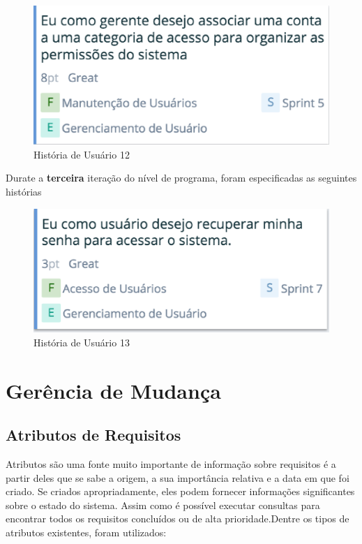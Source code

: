 \begin{figure}[H]
    \centering
	\includegraphics[keepaspectratio=true,scale=0.5]{figuras/time12.eps}
    \caption{História de Usuário 12}
    \label{fig:roadmap}
\end{figure}

Durate a \textbf{terceira} iteração do nível de programa, foram especificadas as seguintes histórias

\begin{figure}[H]
    \centering
	\includegraphics[keepaspectratio=true,scale=0.5]{figuras/time13.eps}
    \caption{História de Usuário 13}
    \label{fig:roadmap}
\end{figure}

\section{Gerência de Mudança}

\subsection{Atributos de Requisitos}

Atributos são uma fonte muito importante de informação sobre requisitos é a partir deles
que se sabe a origem, a sua importância relativa e a data em que foi criado.
Se criados apropriadamente, eles podem fornecer informações significantes sobre
o estado do sistema. Assim como é possível executar consultas para encontrar todos
os requisitos concluídos ou de alta prioridade.Dentre os tipos de atributos existentes,
foram utilizados:

